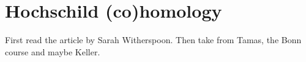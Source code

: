 
\section{Hochschild (co)homology}

	First read the article by Sarah Witherspoon.
	Then take from Tamas, the Bonn course and maybe Keller.
